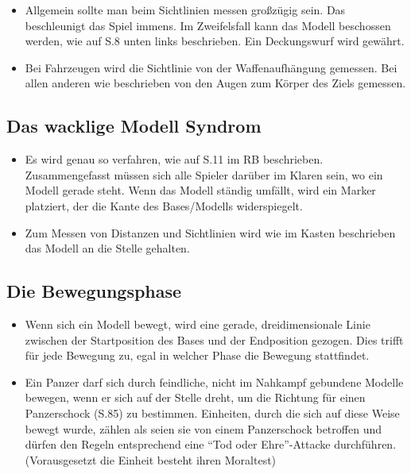 \begin{itemize}

 \item Allgemein sollte man beim Sichtlinien messen großzügig sein. Das
  beschleunigt das Spiel immens. Im Zweifelsfall kann das Modell beschossen
  werden, wie auf S.8 unten links beschrieben. Ein Deckungswurf wird gewährt.

\item Bei Fahrzeugen wird die Sichtlinie von der Waffenaufhängung gemessen. Bei
 allen anderen wie beschrieben von den Augen zum Körper des Ziels gemessen.

\end{itemize}

\subsection{Das wacklige Modell Syndrom}

\begin{itemize}

 \item Es wird genau so verfahren, wie auf S.11 im RB beschrieben.
  Zusammengefasst müssen sich alle Spieler darüber im Klaren sein, wo ein Modell
  gerade steht.  Wenn das Modell ständig umfällt, wird ein Marker platziert, der
  die Kante des Bases/Modells widerspiegelt.

 \item Zum Messen von Distanzen und Sichtlinien wird wie im Kasten beschrieben
  das Modell an die Stelle gehalten.

\end{itemize}

\subsection{Die Bewegungsphase}

\begin{itemize}

 \item Wenn sich ein Modell bewegt, wird eine gerade, dreidimensionale Linie
  zwischen der Startposition des Bases und der Endposition gezogen. Dies trifft
  für jede Bewegung zu, egal in welcher Phase die Bewegung stattfindet.

 \item Ein Panzer darf sich durch feindliche, nicht im Nahkampf gebundene
  Modelle bewegen, wenn er sich auf der Stelle dreht, um die Richtung für einen
  Panzerschock (S.85) zu bestimmen. Einheiten, durch die sich auf diese Weise
  bewegt wurde, zählen als seien sie von einem Panzerschock betroffen und dürfen
  den Regeln entsprechend eine ``Tod oder Ehre''-Attacke durchführen.
  (Vorausgesetzt die Einheit besteht ihren Moraltest)

\end{itemize}

